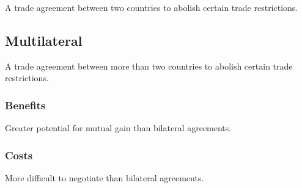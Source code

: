 \documentclass[a4paper,11pt]{article}
\begin{document}
A trade agreement between two countries to abolish certain trade restrictions.


\subsection{Multilateral}

A trade agreement between more than two countries to abolish certain trade
restrictions.


\subsubsection{Benefits}

Greater potential for mutual gain than bilateral agreements.


\subsubsection{Costs}

More difficult to negotiate than bilateral agreements.
\end{document}
